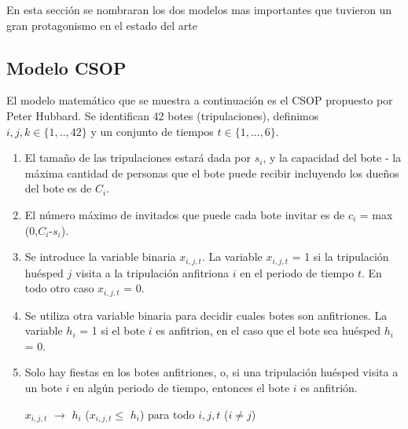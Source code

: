 \documentclass[spanish, fleqn]{article}
\begin{document}
En esta sección se nombraran los dos modelos mas importantes que tuvieron un gran protagonismo en el estado del arte

\subsection*{Modelo CSOP~\cite{Kalvelagen20031713}~\cite{Smith1996}}
El modelo matemático que se muestra a continuación es el CSOP propuesto por Peter Hubbard. Se identifican 42 botes (tripulaciones), definimos $\mathit{i},\mathit{j},\mathit{k} \in \{1,..,42\}$ y un conjunto de tiempos $\mathit{t} \in \{1,...,6\}$.
\begin{enumerate}
\item El tamaño de las tripulaciones estará dada por $\mathit{s}_{\mathit{i}}$, y la capacidad del bote - la máxima cantidad de personas que el bote puede recibir incluyendo los dueños del bote es de $\mathit{C}_{\mathit{i}}$.

\item El número máximo de invitados que puede cada bote invitar es de $\mathit{c}_{\mathit{i}}$ = max (0,$\mathit{C}_{\mathit{i}}$-$\mathit{s}_{\mathit{i}}$).

\item Se introduce la variable binaria $\mathit{x}_{\mathit{i},\mathit{j},\mathit{t}}$. La variable $\mathit{x}_{\mathit{i},\mathit{j},\mathit{t}}$ = 1 si la tripulación huésped $\mathit{j}$ visita a la tripulación anfitriona $\mathit{i}$ en el periodo de tiempo $\mathit{t}$. En todo otro caso $\mathit{x}_{\mathit{i},\mathit{j},\mathit{t}}$ = 0.

\item Se utiliza otra variable binaria para decidir cuales botes son anfitriones. La variable $\mathit{h}_{\mathit{i}}$ = 1 si el bote $\mathit{i}$ es anfitrion, en el caso que el bote sea huésped $\mathit{h}_{\mathit{i}}$ = 0.

\item Solo hay fiestas en los botes anfitriones, o, si una tripulación huésped visita a un bote $\mathit{i}$ en algún periodo de tiempo, entonces el bote $\mathit{i}$ es anfitrión.

\begin{center}
$\mathit{x}_{\mathit{i},\mathit{j},\mathit{t}}$ $\rightarrow$ $\mathit{h}_{\mathit{i}}$ ($\mathit{x}_{\mathit{i},\mathit{j},\mathit{t}} \leq $  $\mathit{h}_{\mathit{i}}$) para todo $\mathit{i},\mathit{j},\mathit{t}$ ($\mathit{i} \neq \mathit{j}$)
\end{center}


\end{enumerate}
\end{document}
